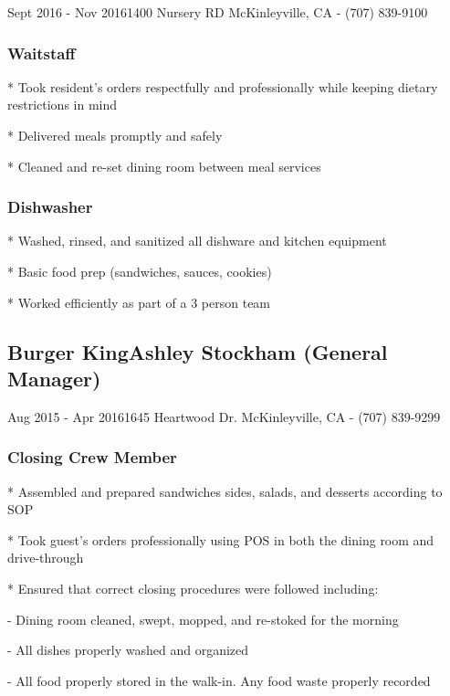 \documentclass{article}
\begin{document}
\hspace{-.3in}Sept 2016 - Nov 2016\hfill 1400 Nursery RD McKinleyville, CA - (707) 839-9100


\subsubsection{Waitstaff}

* Took resident's orders respectfully and professionally while keeping dietary restrictions in mind

* Delivered meals promptly and safely

* Cleaned and re-set dining room between meal services

\subsubsection{Dishwasher}

* Washed, rinsed, and sanitized all dishware and kitchen equipment 

* Basic food prep (sandwiches, sauces, cookies)

* Worked efficiently as part of a 3 person team


\subsection{Burger King\hfill Ashley Stockham (General Manager)}

\hspace{-.3in}Aug 2015 - Apr 2016\hfill 1645 Heartwood Dr. McKinleyville, CA - (707) 839-9299

\subsubsection{Closing Crew Member}

* Assembled and prepared sandwiches sides, salads, and desserts according to SOP

* Took guest's orders professionally using POS in both the dining room and drive-through

* Ensured that correct closing procedures were followed including:

\hspace{.25in} - Dining room cleaned, swept, mopped, and re-stoked for the morning 

\hspace{.25in} - All dishes properly washed and organized

\hspace{.25in} - All food properly stored in the walk-in. Any food waste properly recorded
\end{document}
